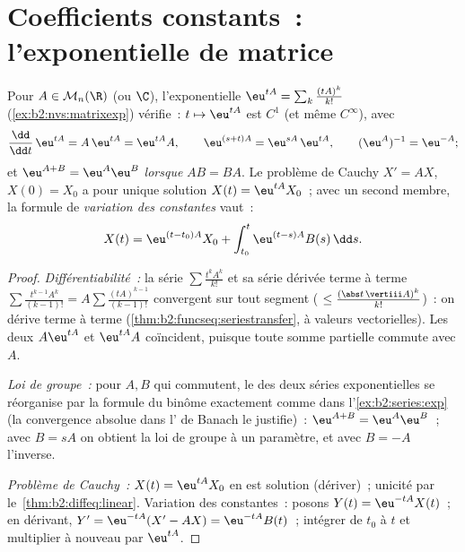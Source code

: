 \section{Coefficients constants~: l'exponentielle de matrice}

\begin{theorem}\label{thm:b2:diffeq:matrixexp}
Pour $A \in \mathcal{M}_n(\R)$ (ou $\C$), l'exponentielle $\eu^{tA}
= \sum_k \frac{(tA)^k}{k!}$ (\cref{ex:b2:nvs:matrixexp}) vérifie~:
$t \mapsto \eu^{tA}$ est $C^1$ (et même $C^\infty$),
avec
\[
\frac{\dd}{\dd t}\,\eu^{tA} = A\,\eu^{tA} = \eu^{tA}A ,
\qquad
\eu^{(s+t)A} = \eu^{sA}\,\eu^{tA},
\qquad
(\eu^{A})^{-1} = \eu^{-A} ;
\]
et $\eu^{A + B} = \eu^A\eu^B$ \emph{lorsque} $AB = BA$. Le problème
de Cauchy $X' = AX$, $X(0) = X_0$ a pour unique solution $X(t) =
\eu^{tA}X_0$~; avec un second membre, la formule de \emph{variation
des constantes} vaut~:
\[
X(t) = \eu^{(t - t_0)A}X_0 + \int_{t_0}^{t} \eu^{(t-s)A}B(s)\,\dd
s .
\]
\end{theorem}

\begin{proof}
\emph{Différentiabilité~:} la série $\sum \frac{t^kA^k}{k!}$ et
sa série dérivée terme à terme $\sum \frac{t^{k-1}A^k}{(k-1)!} = A\sum
\frac{(tA)^{k-1}}{(k-1)!}$ convergent  sur tout segment
( $\leq \frac{(\abs t\,\vertiii A)^k}{k!}$)~: on dérive terme
à terme (\cref{thm:b2:funcseq:seriestransfer}, à valeurs
vectorielles). Les deux  $A\eu^{tA}$ et $\eu^{tA}A$
coïncident, puisque toute somme partielle commute avec $A$.

\emph{Loi de groupe~:} pour $A, B$ qui commutent, le  des deux séries exponentielles se réorganise par la formule
du binôme exactement comme dans l'\cref{ex:b2:series:exp} (la
convergence absolue dans l' de Banach le justifie)~:
$\eu^{A+B} = \eu^A\eu^B$~; avec $B = sA$ on obtient la loi de groupe
à un paramètre, et avec $B = -A$ l'inverse.

\emph{Problème de Cauchy~:} $X(t) = \eu^{tA}X_0$ en est solution
(dériver)~; unicité par le~\cref{thm:b2:diffeq:linear}. Variation
des constantes~: posons $Y(t) = \eu^{-tA}X(t)$~; en dérivant, $Y' =
\eu^{-tA}(X' - AX) = \eu^{-tA}B(t)$~; intégrer de $t_0$ à $t$ et
multiplier à nouveau par $\eu^{tA}$.
\end{proof}

